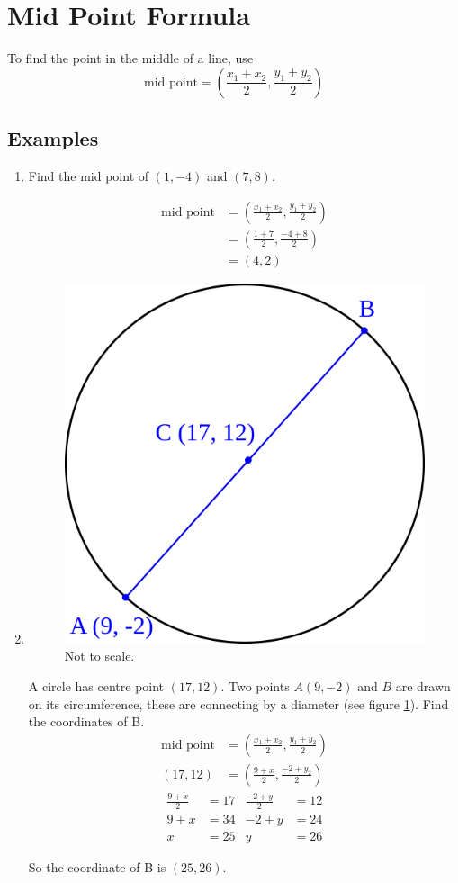 \section{Mid Point Formula}
To find the point in the middle of a line, use
\begin{equation}
\text{mid point} = \left(\frac{x_1 + x_2}{2},\frac{y_1 + y_2}{2}\right)
\end{equation}

\subsection{Examples}
\begin{enumerate}
	\item
	Find the mid point of $\left(1,-4\right)$ and $\left(7,8\right)$.
	
	\begin{align*}
		\text{mid point} &= \left(\frac{x_1 + x_2}{2},\frac{y_1 + y_2}{2}\right)\\
		&= \left(\frac{1 + 7}{2},\frac{-4 + 8}{2}\right)\\
		&= \left(4,2\right)
	\end{align*}
	
	\item
	\begin{figure}[h!]
		\centering
		\includegraphics[width=0.5\linewidth]{images/MidPointQ2.png}
		\caption{Not to scale.}
		\label{fig:MidPointQ2}
	\end{figure}
	A circle has centre point $\left(17, 12\right)$. Two points $A(9, -2)$ and $B$ are drawn on its circumference, these are connecting by a diameter (see figure \ref{fig:MidPointQ2}). Find the coordinates of B.
	\begin{align*}
		\text{mid point} &= \left(\frac{x_1 + x_2}{2},\frac{y_1 + y_2}{2}\right)\\
		\left(17, 12\right) &= \left(\frac{9+x}{2},\frac{-2 + y_2}{2}\right)
	\end{align*}
	\begin{align*}
		\frac{9+x}{2} &= 17 & \frac{-2+y}{2} &= 12\\
		9+x &= 34 & -2+y &= 24\\
		x &= 25 & y &= 26
	\end{align*}
	
	So the coordinate of B is $\left(25,26\right)$.
\end{enumerate}


